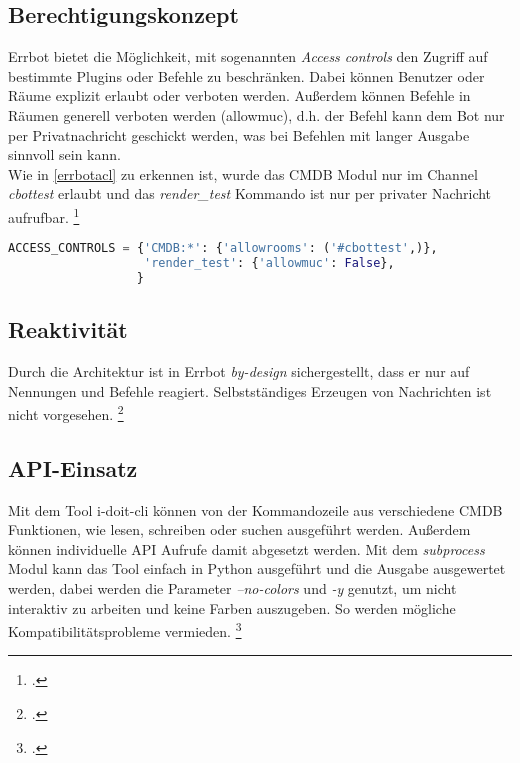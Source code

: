 \subsection{Berechtigungskonzept}
Errbot bietet die Möglichkeit, mit sogenannten \textit{Access controls} den Zugriff auf bestimmte Plugins oder Befehle zu beschränken. Dabei können Benutzer oder Räume explizit erlaubt oder verboten werden. Außerdem können Befehle in Räumen generell verboten werden (allowmuc), d.h. der Befehl kann dem Bot nur per Privatnachricht geschickt werden, was bei Befehlen mit langer Ausgabe sinnvoll sein kann.\\
Wie in \autoref{errbotacl} zu erkennen ist, wurde das \acs{CMDB} Modul nur im Channel \textit{cbottest} erlaubt und das \textit{render\_test} Kommando ist nur per privater Nachricht aufrufbar.
\footcite[Vgl.][o. \pno]{errbot_2018_config-template}

\newpage
\begin{lstlisting}[language=python, label=errbotacl, caption=Errbot Access controls]
ACCESS_CONTROLS = {'CMDB:*': {'allowrooms': ('#cbottest',)},
                   'render_test': {'allowmuc': False},
                  }
\end{lstlisting}

\subsection{Reaktivität}
Durch die Architektur ist in Errbot \textit{by-design} sichergestellt, dass er nur auf Nennungen und Befehle reagiert. Selbstständiges Erzeugen von Nachrichten ist nicht vorgesehen.
\footcite[Vgl.][o. \pno]{errbot_2018_mentions}

\subsection{API-Einsatz}
Mit dem Tool i-doit-cli können von der Kommandozeile aus verschiedene \acs{CMDB} Funktionen, wie lesen, schreiben oder suchen ausgeführt werden. Außerdem können individuelle API Aufrufe damit abgesetzt werden. Mit dem \textit{subprocess} Modul kann das Tool einfach in Python ausgeführt und die Ausgabe ausgewertet werden, dabei werden die Parameter \textit{--no-colors} und \textit{-y} genutzt, um nicht interaktiv zu arbeiten und keine Farben auszugeben. So werden mögliche Kompatibilitätsprobleme vermieden.
\footcite[Vgl.][o. \pno]{Heisig_2019_idoitcli}

\newpage

